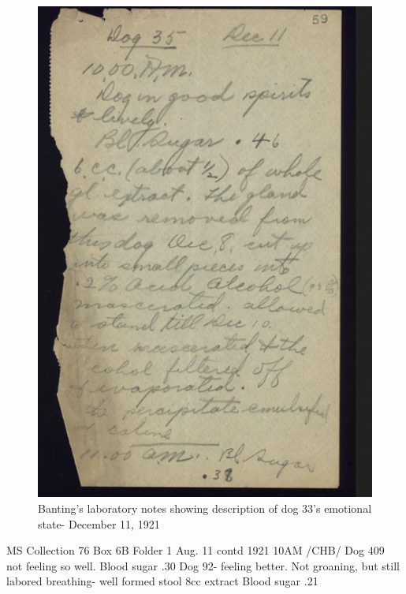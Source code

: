 \documentclass[12pt]{article}
\begin{document}
\begin{figure}[H]
\centering
 \includegraphics [width=5.5in]{Dog_lab}
  \caption{Banting's laboratory notes showing description of dog 33's emotional state- December 11, 1921}
  \label{fig:Dog 33 Laboratory Note}
\end{figure}


MS Collection 76
Box 6B 
Folder 1
Aug. 11 contd 1921
10AM /CHB/
Dog 409 not feeling so well. Blood sugar .30
Dog 92- feeling better. Not groaning, but still labored breathing- well formed stool
8cc extract
Blood sugar .21
\end{document}
